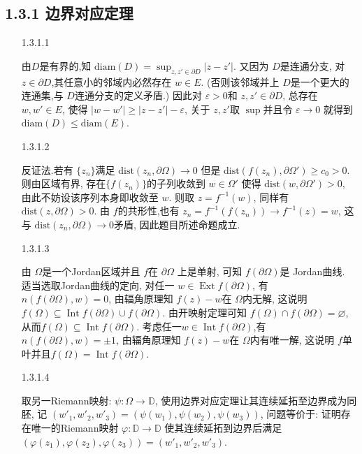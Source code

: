  \subsection*{1.3.1 边界对应定理}
 \begin{itemize}
    \item[1.3.1.1]

由$D$是有界的,知 $\text{diam}(D) = \sup_{z,z' \in \partial D}|z-z'|$.
又因为 $D$是连通分支, 对$z\in \partial D$,其任意小的邻域内必然存在 $w \in  E$. 
(否则该邻域并上 $D$是一个更大的连通集,与 $D$连通分支的定义矛盾.)
因此对 $\varepsilon>0$和 $z,z' \in \partial D$, 总存在$w,w'\in E$, 
使得 $|w-w'|\ge |z-z'|-\varepsilon$, 关于 $z,z'$取 $\sup$并且令 $\varepsilon\to 0$
就得到 $\text{diam}(D)\le \text{diam}(E)$.

    \item[1.3.1.2]

反证法.若有 $\{z_n\}$满足 $\text{dist}(z_n,\partial \Omega)\to 0$
但是 $\text{dist}(f(z_n),\partial\Omega')\ge c_0>0$. 
则由区域有界, 存在$\{f(z_n)\}$的子列收敛到 $w \in \Omega'$
使得 $\text{dist}(w,\partial \Omega')>0$, 由此不妨设该序列本身即收敛至 $w$. 
则取 $z = f^{-1}(w)$, 同样有 $\text{dist}(z,\partial \Omega)>0$. 
由 $f$的共形性,也有 $z_n = f^{-1}(f(z_n))\to f^{-1}(z)=w$, 
这与 $\text{dist}(z_n,\partial \Omega)\to 0$矛盾, 因此题目所述命题成立. 

    \item[1.3.1.3]

由 $\Omega$是一个Jordan区域并且 $f$在 $\partial \Omega$ 上是单射,
可知 $f(\partial \Omega)$是 Jordan曲线. 适当选取Jordan曲线的定向, 
对任一 $w \in \operatorname{Ext}f(\partial \Omega)$,
有 $n(f(\partial \Omega),w) = 0$, 由辐角原理知 $f(z)-w$在 $\Omega$内无解,
这说明 $f(\Omega)\subseteq \operatorname{Int}f(\partial \Omega) \cup f(\partial \Omega)$. 
由开映射定理可知 $f(\Omega)\cap f(\partial \Omega) =\varnothing$, 
从而$f(\Omega)\subseteq \operatorname{Int}f(\partial \Omega)$. 
考虑任一$w \in \operatorname{Int}f(\partial \Omega)$,有 $n(f(\partial \Omega),w) = \pm 1$, 
由辐角原理知 $f(z)-w$在 $\Omega$内有唯一解, 
这说明 $f$单叶并且$f(\Omega)=\operatorname{Int}f(\partial \Omega)$.


    \item[1.3.1.4]

取另一Riemann映射: $\psi:\Omega\to \mathbb{D}$, 
使用边界对应定理让其连续延拓至边界成为同胚, 
记 $(w'_1,w'_2,w'_3) = (\psi(w_1), \psi(w_2), \psi(w_3))$, 问题等价于:
证明存在唯一的Riemann映射 $\varphi:\mathbb{D}\to \mathbb{D}$
使其连续延拓到边界后满足 
$(\varphi(z_1), \varphi(z_2), \varphi(z_3)) = (w'_1,w'_2,w'_3)$.


\end{itemize}
